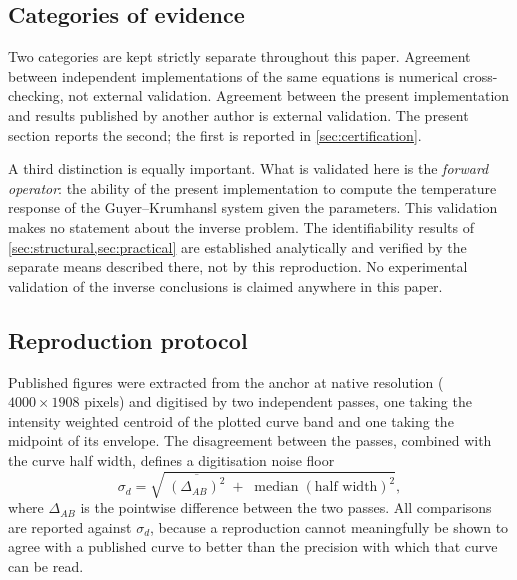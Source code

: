 \documentclass[preprint,12pt,a4paper]{elsarticle}
\theoremstyle{plain}
\theoremstyle{definition}
\theoremstyle{remark}
\begin{document}
\subsection{Categories of evidence}
\label{sec:val-scope}

Two categories are kept strictly separate throughout this paper.
Agreement between independent implementations of the same equations is
numerical cross-checking, not external validation. Agreement between the
present implementation and results published by another author is external
validation.
The present section reports the second; the first is reported in
\cref{sec:certification}.

A third distinction is equally important. What is validated here is the
\emph{forward operator}: the ability of the present implementation to compute
the temperature response of the Guyer--Krumhansl system given the parameters.
This validation makes no statement about the inverse problem. The
identifiability results
of \cref{sec:structural,sec:practical} are established analytically and
verified by the separate means described there, not by this reproduction. No
experimental validation of the inverse conclusions is claimed anywhere in this
paper.

\subsection{Reproduction protocol}
\label{sec:val-method}

Published figures were extracted from the anchor at native resolution
($4000 \times 1908$ pixels) and digitised by two independent passes, one taking
the intensity weighted centroid of the plotted curve band and one taking the
midpoint of its envelope. The disagreement between the passes, combined with
the curve half width, defines a digitisation noise floor
%
\begin{equation}
  \sigma_{d} = \sqrt{\;\overline{\left(\Delta_{AB}\right)^{2}}
                     \;+\; \operatorname{median}(\text{half width})^{2} } ,
  \label{eq:sigmad}
\end{equation}
%
where $\Delta_{AB}$ is the pointwise difference between the two passes. All
comparisons are reported against $\sigma_{d}$, because a reproduction cannot
meaningfully be shown to agree with a published curve to better than the
precision with which that curve can be read.
\end{document}
